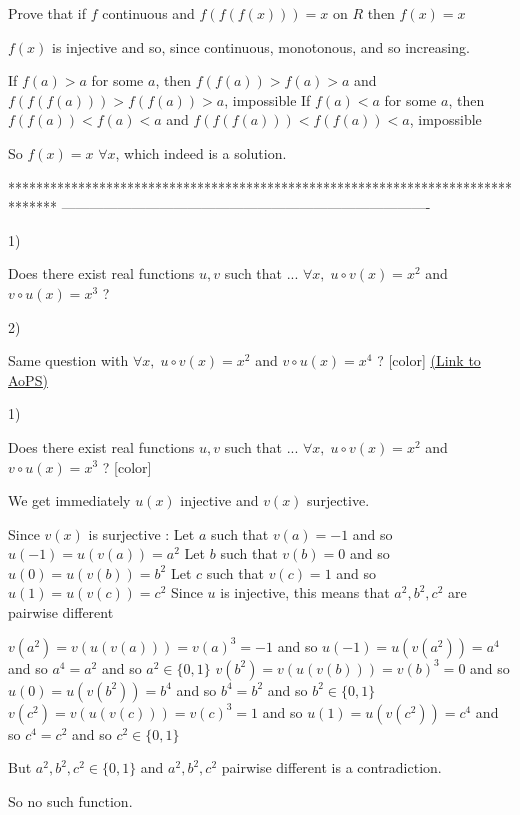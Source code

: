 \begin{solution}
	\begin{tcolorbox}Prove that if $f$ continuous and $f(f(f(x)))=x$ on $R$ then $f(x)=x$\end{tcolorbox}

$f(x)$ is injective and so, since continuous, monotonous, and so increasing.

If $f(a)>a$ for some $a$, then $f(f(a))>f(a)>a$ and $f(f(f(a)))>f(f(a))>a$, impossible
If $f(a)<a$ for some $a$, then $f(f(a))<f(a)<a$ and $f(f(f(a)))<f(f(a))<a$, impossible

So $\boxed{f(x)=x}$ $\forall x$, which indeed is a solution.
\end{solution}
*******************************************************************************
-------------------------------------------------------------------------------

\begin{problem}\begin{bolded}1)\end{bolded}  Does there exist real functions $u, v$ such that ... 
$\forall x, \; u\circ v(x)=x^2$ and $v\circ u(x)=x^3$ ? 
\begin{bolded}2)\end{bolded}  Same question with  $\forall x, \; u\circ v(x)=x^2$ and $v\circ u(x)=x^4$ ? [\/color]
	\flushright \href{https://artofproblemsolving.com/community/c6h549246}{(Link to AoPS)}
\end{problem}



\begin{solution}
	\begin{tcolorbox}[color=#000080]\begin{bolded}1)\end{bolded}  Does there exist real functions $u, v$ such that ... 
$\forall x, \; u\circ v(x)=x^2$ and $v\circ u(x)=x^3$ ? [\/color]\end{tcolorbox}
We get immediately $u(x)$ injective and $v(x)$ surjective.

Since $v(x)$ is surjective :
Let $a$ such that $v(a)=-1$ and so $u(-1)=u(v(a))=a^2$
Let $b$ such that $v(b)=0$ and so $u(0)=u(v(b))=b^2$
Let $c$ such that $v(c)=1$ and so $u(1)=u(v(c))=c^2$
Since $u$ is injective, this means that $a^2,b^2,c^2$ are pairwise different

$v(a^2)=v(u(v(a)))=v(a)^3=-1$ and so $u(-1)=u(v(a^2))=a^4$ and so $a^4=a^2$ and so $a^2\in\{0,1\}$
$v(b^2)=v(u(v(b)))=v(b)^3=0$ and so $u(0)=u(v(b^2))=b^4$ and so $b^4=b^2$ and so $b^2\in\{0,1\}$
$v(c^2)=v(u(v(c)))=v(c)^3=1$ and so $u(1)=u(v(c^2))=c^4$ and so $c^4=c^2$ and so $c^2\in\{0,1\}$

But $a^2,b^2,c^2\in\{0,1\}$ and $a^2,b^2,c^2$ pairwise different is a contradiction.

So no such function.
\end{solution}



